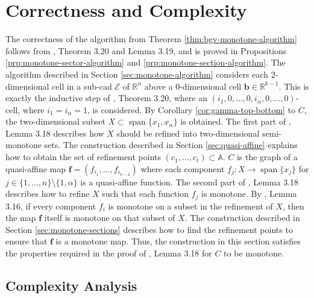 \documentclass[
]{book}
\theoremstyle{definition}
\theoremstyle{definition}
\theoremstyle{definition}
\theoremstyle{definition}
\theoremstyle{remark}
\begin{document}
\hypertarget{correctness-and-complexity-1}{%
\section{Correctness and Complexity}\label{correctness-and-complexity-1}}

The correctness of the algorithm from Theorem \ref{thm:bgv-monotone-algorithm} follows from \citet{bgv15}, Theorem 3.20 and Lemma 3.19, and is proved in Propositions \ref{prp:monotone-sector-algorithm} and \ref{prp:monotone-section-algorithm}.
The algorithm described in Section \ref{sec:monotone-algorithm} considers each \(2\)-dimensional cell in a sub-cad \(\mathcal{E}\) of \(\mathbb{R}^n\) above a \(0\)-dimensional cell \(\mathbf{b} \in \mathbb{R}^{k-1}\). This is exactly the inductive step of \citet{bgv15}, Theorem 3.20, where an \((i_1,0,\ldots,0,i_{\alpha},0,\ldots,0)\)-cell, where \(i_1 = i_\alpha = 1\), is considered.
By Corollary \ref{cor:gamma-top-bottom} to \(C\), the two-dimensional subset \(X \subset {\operatorname{span} \{x_1,x_\alpha\}}\) is obtained. The first part of \citet{bgv15}, Lemma 3.18 describes how \(X\) should be refined into two-dimensional semi-monotone sets. The construction described in Section \ref{sec:quasi-affine} explains how to obtain the set of refinement points \((c_1,\ldots,c_t) \subset \mathbb{A}\).
\(C\) is the graph of a quasi-affine map \(\mathbf{f} = (f_{i_1},\ldots,f_{i_{n-2}})\) where each component \(f_j : X \to {\operatorname{span} \{x_j\}}\) for \(j \in \{1,\ldots,n\} \setminus \{1,\alpha\}\) is a quasi-affine function. The second part of \citet{bgv15}, Lemma 3.18 describes how to refine \(X\) such that each function \(f_j\) is monotone. By \citet{bgv15}, Lemma 3.16, if every component \(f_i\) is monotone on a subset in the refinement of \(X\), then the map \(\mathbf{f}\) itself is monotone on that subset of \(X\).
The construction described in Section \ref{sec:monotone-sections} describes how to find the refinement points to ensure that \(\mathbf{f}\) is a monotone map.
Thus, the construction in this section satisfies the properties required in the proof of \citet{bgv15}, Lemma 3.18 for \(C\) to be monotone.

\hypertarget{sec:monotone-complexity}{%
\subsection{Complexity Analysis}\label{sec:monotone-complexity}}
\end{document}
